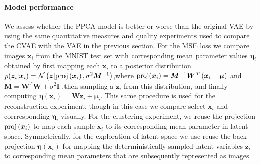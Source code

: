 \paragraph{Model performance}
We assess whether the PPCA model is better or worse than the original VAE by using the same quantitative measures and quality experiments used to compare the CVAE with the VAE in the previous section. For the MSE loss we compare images $\bm{x}_i$ from the MNIST test set with corresponding mean parameter values $\bm{\eta}_i$ obtained by first mapping each $\bm{x}_i$ to a posterior distribution $p(\bm{z}_i|\bm{x}_i) = \mathcal{N}\left (\bm{z}| \text{proj}\left (\bm{x}_i\right), \sigma^2 \bm{M}^{-1}\right)$,where  $\text{proj}(\bm{x}_i) = \bm{M}^{-1} \bm{W}^T\left (\bm{x}_i - \bm{\mu}\right)$ and $\bm{M} = \bm{W}^{T}\bm{W} + \sigma^2 \bm{I}$ ,then sampling a $\bm{z}_i$ from this distribution, and finally computing $\bm{\eta}(\bm{x}_i) = \bm{W}\bm{z}_i + \bm{\mu}_i$. This same procedure is used for the reconstruction experiment, though in this case we compare select $\bm{x}_i$ and corrresponding $\bm{\eta}_i$ visually. For the clustering experiment, we reuse the projection  $\text{proj}\left (\bm{x}_i\right)$ to map each sample $\bm{x}_i$ to its corresponding mean parameter in latent space. Symmetrically, for the exploration of latent space we use reuse the back-projection $\bm{\eta}(\bm{x}_i)$ for mapping the deterministically sampled latent variables $\bm{z}_i$ to corresponding mean parameters that are subsequently represented as images.